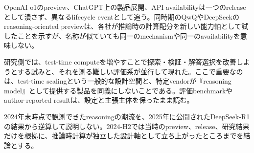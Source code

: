 
OpenAI o1のpreview、ChatGPT上の製品展開、API availabilityは一つのreleaseとして潰さず、異なるlifecycle eventとして追う。同時期のQwQやDeepSeekのreasoning-oriented previewは、各社が推論時の計算配分を新しい能力軸として試したことを示すが、名称が似ていても同一のmechanismや同一のavailabilityを意味しない。\autocite{src-14a855188533,src-a452b2dc7f5d,src-ea823ed75f72}


研究側では、test-time computeを増やすことで探索・検証・解答選択を改善しようとする試みと、それを測る難しい評価系が並行して現れた。ここで重要なのは、test-time scalingという一般的な設計空間と、特定vendorが『reasoning model』として提供する製品を同義にしないことである。評価benchmarkやauthor-reported resultは、設定と主張主体を保ったまま読む。\autocite{src-1f00c386f820,src-259b57a1bad9,src-7c2651c80f45,src-9cf289b414fd}


\begin{claimboundary}
2024年末時点で観測できたreasoningの潮流を、2025年に公開されたDeepSeek-R1の結果から逆算して説明しない。2024-H2では当時のpreview、release、研究結果だけを根拠に、推論時計算が独立した設計軸として立ち上がったところまでを結論とする。\autocite{src-ea823ed75f72}
\end{claimboundary}
